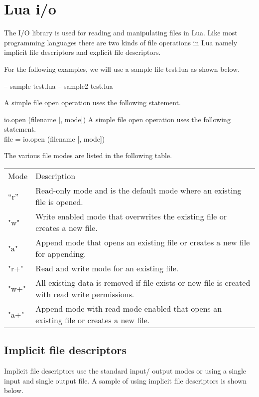 \chapter{Lua i/o}
\label{ch:luaio}


The I/O library is used for reading and manipulating files in Lua. Like most programming languages there are two kinds of file operations in Lua namely implicit file descriptors and explicit file descriptors.

For the following examples, we will use a sample file test.lua as shown below.

\begin{phdverbatim}
-- sample test.lua
-- sample2 test.lua
\end{phdverbatim}

A simple file open operation uses the following statement.


\begin{docLua}{io.open (filename [, mode])}
A simple file open operation uses the following statement.\\
file = io.open (filename [, mode])
\end{docLua}

The various file modes are listed in the following table.

\begin{longtable}{ll}
Mode	& Description\\
\enquote{r}	& Read-only mode and is the default mode where an existing file is opened.\\
"w"	& Write enabled mode that overwrites the existing file or creates a new file.\\
"a"	& Append mode that opens an existing file or creates a new file for appending.\\
"r+"	& Read and write mode for an existing file.\\
"w+"	& All existing data is removed if file exists or new file is created with read write permissions.\\
"a+"	& Append mode with read mode enabled that opens an existing file or creates a new file.\\
\end{longtable}

\section{Implicit file descriptors}

Implicit file descriptors use the standard input/ output modes or using a single input and single output file. A sample of using implicit file descriptors is shown below.

